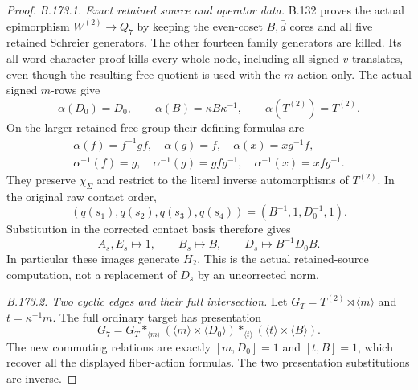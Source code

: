 \begin{proof}
\emph{B.173.1. Exact retained source and operator data.}
B.132 proves the actual epimorphism
\(W^{(2)}\to Q_7\) by keeping the even-coset \(B,\bar d\) cores
and all five retained Schreier generators. The other fourteen family
generators are killed. Its all-word character proof kills every whole
node, including all signed \(v\)-translates, even though the resulting
free quotient is used with the \(m\)-action only.
The actual signed \(m\)-rows give
\[
 \alpha(D_0)=D_0,\qquad
 \alpha(B)=\kappa B\kappa^{-1},\qquad
 \alpha(T^{(2)})=T^{(2)}.
 \tag{B.173.1}
\]
On the larger retained free group their defining formulas are
\[
 \begin{gathered}
 \alpha(f)=f^{-1}gf,\quad \alpha(g)=f,\quad
 \alpha(x)=xg^{-1}f,\\
 \alpha^{-1}(f)=g,\quad\alpha^{-1}(g)=gfg^{-1},\quad
 \alpha^{-1}(x)=xfg^{-1}.
 \end{gathered}
\]
They preserve \(\chi_\Sigma\) and restrict to the literal inverse
automorphisms of \(T^{(2)}\). In the original raw contact order,
\[
 (q(s_1),q(s_2),q(s_3),q(s_4))
       =(B^{-1},1,D_0^{-1},1).
\]
Substitution in the corrected contact basis therefore gives
\begin{equation}\label{eq:B173-contact-images}
 A_s,E_s\longmapsto1,\qquad
 B_s\longmapsto B,\qquad D_s\longmapsto B^{-1}D_0B.
\end{equation}
In particular these images generate \(H_2\). This is the actual
retained-source computation, not a replacement of \(D_s\) by an
uncorrected norm.

\emph{B.173.2. Two cyclic edges and their full intersection.}
Let \(G_T=T^{(2)}\rtimes\langle m\rangle\) and
\(t=\kappa^{-1}m\). The full ordinary target has presentation
\begin{equation}\label{eq:B173-two-edges}
 G_7=G_T*_{\langle m\rangle}
        (\langle m\rangle\times\langle D_0\rangle)
       *_{\langle t\rangle}
        (\langle t\rangle\times\langle B\rangle).
\end{equation}
The new commuting relations are exactly
\([m,D_0]=1\) and \([t,B]=1\), which recover all the displayed
fiber-action formulas. The two presentation substitutions are inverse.


\end{proof}
